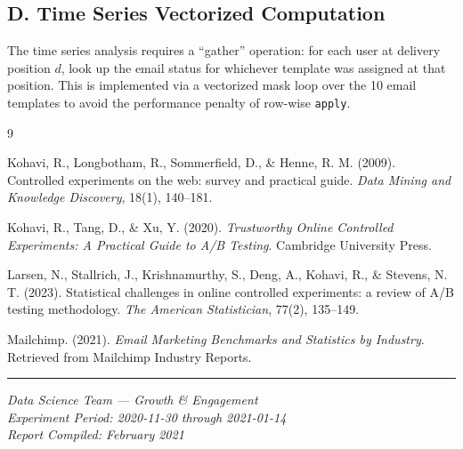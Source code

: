 \documentclass[12pt,a4paper]{article}
\begin{document}
\subsection*{D. Time Series Vectorized Computation}

The time series analysis requires a ``gather'' operation: for each user at
delivery position $d$, look up the email status for whichever template was assigned
at that position. This is implemented via a vectorized mask loop over the
10 email templates to avoid the performance penalty of row-wise \texttt{apply}.

\clearpage
\begin{thebibliography}{9}

  Kohavi, R., Longbotham, R., Sommerfield, D., \& Henne, R. M. (2009).
  Controlled experiments on the web: survey and practical guide.
  \textit{Data Mining and Knowledge Discovery}, 18(1), 140--181.

  Kohavi, R., Tang, D., \& Xu, Y. (2020).
  \textit{Trustworthy Online Controlled Experiments: A Practical Guide to A/B Testing}.
  Cambridge University Press.

  Larsen, N., Stallrich, J., Krishnamurthy, S., Deng, A., Kohavi, R., \& Stevens, N. T. (2023).
  Statistical challenges in online controlled experiments: a review of A/B testing methodology.
  \textit{The American Statistician}, 77(2), 135--149.

  Mailchimp. (2021).
  \textit{Email Marketing Benchmarks and Statistics by Industry}.
  Retrieved from Mailchimp Industry Reports.

\end{thebibliography}

\vspace{2cm}
\hrule
\vspace{0.5cm}
\begin{center}
  \small
  \textit{Data Science Team — Growth \& Engagement} \\
  \textit{Experiment Period: 2020-11-30 through 2021-01-14} \\
  \textit{Report Compiled: February 2021}
\end{center}
\end{document}
